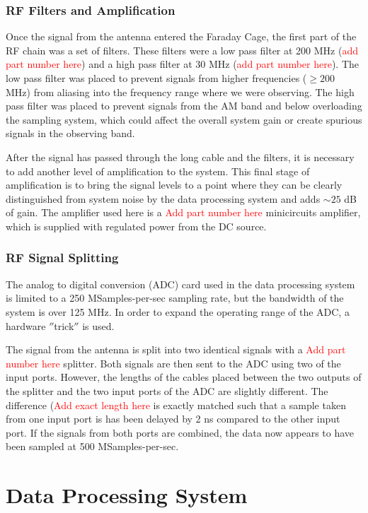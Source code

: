 \subsubsection{RF Filters and Amplification}
Once the signal from the antenna entered the Faraday Cage, the first part of the RF chain was a set of filters. These filters were a low pass filter at 200 MHz (\textcolor{red}{add part number here}) and a high pass filter at 30 MHz (\textcolor{red}{add part number here}). The low pass filter was placed to prevent signals from higher frequencies ($\geq 200$ MHz) from aliasing into the frequency range where we were observing. The high pass filter was placed to prevent signals from the AM band and below overloading the sampling system, which could affect the overall system gain or create spurious signals in the observing band. 

After the signal has passed through the long cable and the filters, it is necessary to add another level of amplification to the system. This final stage of amplification is to bring the signal levels to a point where they can be clearly distinguished from system noise by the data processing system and adds $\sim25$ dB of gain. The amplifier used here is a \textcolor{red}{Add part number here} minicircuits amplifier, which is supplied with regulated power from the DC source. 

\subsubsection{RF Signal Splitting} \label{Sec:hard_split}
The analog to digital conversion (ADC) card used in the data processing system is limited to a 250 MSamples-per-sec sampling rate, but the bandwidth of the system is over 125 MHz. In order to expand the operating range of the ADC, a hardware $''$trick$''$ is used.

The signal from the antenna is split into two identical signals with a \textcolor{red}{Add part number here} splitter. Both signals are then sent to the ADC using two of the input ports. However, the lengths of the cables placed between the two outputs of the splitter and the two input ports of the ADC are slightly different. The difference (\textcolor{red}{Add exact length here} is exactly matched such that a sample taken from one input port is has been delayed by 2 ns compared to the other input port. If the signals from both ports are combined, the data now appears to have been sampled at 500 MSamples-per-sec. 


\section{Data Processing System}

